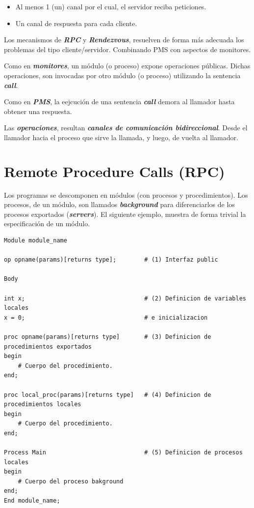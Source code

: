\documentclass[a4paper, 10pt]{report}
\begin{document}
\begin{itemize}
	\item Al menos 1 (un) canal por el cual, el servidor reciba peticiones.
	\item Un canal de respuesta para cada cliente.
\end{itemize}

Los mecanismos de \textbf{\emph{RPC}} y \textbf{\emph{Rendezvous}}, resuelven de forma más adecuada los problemas del tipo cliente/servidor. Combinando PMS con aspectos de monitores.

Como en \textbf{\emph{monitores}}, un módulo (o proceso) expone operaciones públicas. Dichas operaciones, son invocadas por otro módulo (o proceso) utilizando la sentencia \textbf{\emph{call}}.

Como en \textbf{\emph{PMS}}, la eejcución de una sentencia \textbf{\emph{call}} demora al llamador hasta obtener una respuesta.

Las \textbf{\emph{operaciones}}, resultan \textbf{\emph{canales de comunicación bidireccional}}. Desde el llamador hacia el proceso que sirve la llamada, y luego, de vuelta al llamador.


\section{Remote Procedure Calls (RPC)}

Los programas se descomponen en módulos (con procesos y procedimientos). Los procesos, de un módulo, son llamados \textbf{\emph{background}} para diferenciarlos de los procesos exportados (\textbf{\emph{servers}}). El siguiente ejemplo, muestra de forma trivial la especificación de un módulo.

\noindent
\begin{minipage}{\textwidth}
\begin{lstlisting}
Module module_name

op opname(params)[returns type];        # (1) Interfaz public

Body

int x;                                  # (2) Definicion de variables locales
x = 0;                                  # e inicializacion    

proc opname(params)[returns type]       # (3) Definicion de procedimientos exportados
begin
	# Cuerpo del procedimiento.
end;

proc local_proc(params)[returns type]   # (4) Definicion de procedimientos locales
begin
	# Cuerpo del procedimiento.
end;

Process Main                            # (5) Definicion de procesos locales
begin                            		
	# Cuerpo del proceso bakground
end;
End module_name;
\end{lstlisting}	
\end{minipage}
\end{document}
